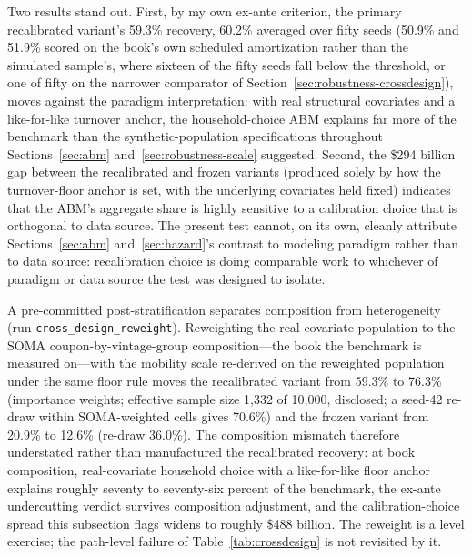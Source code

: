 \documentclass[12pt]{article}
\begin{document}
Two results stand out. First, by my own ex-ante criterion, the primary recalibrated variant's 59.3\% recovery, 60.2\% averaged over fifty seeds (50.9\% and 51.9\% scored on the book's own scheduled amortization rather than the simulated sample's, where sixteen of the fifty seeds fall below the threshold, or one of fifty on the narrower comparator of Section~\ref{sec:robustness-crossdesign}), moves against the paradigm interpretation: with real structural covariates and a like-for-like turnover anchor, the household-choice ABM explains far more of the benchmark than the synthetic-population specifications throughout Sections~\ref{sec:abm} and~\ref{sec:robustness-scale} suggested. Second, the \$294 billion gap between the recalibrated and frozen variants (produced solely by how the turnover-floor anchor is set, with the underlying covariates held fixed) indicates that the ABM's aggregate share is highly sensitive to a calibration choice that is orthogonal to data source. The present test cannot, on its own, cleanly attribute Sections~\ref{sec:abm} and~\ref{sec:hazard}'s contrast to modeling paradigm rather than to data source: recalibration choice is doing comparable work to whichever of paradigm or data source the test was designed to isolate.

A pre-committed post-stratification separates composition from heterogeneity (run \texttt{cross\_design\_reweight}). Reweighting the real-covariate population to the SOMA coupon-by-vintage-group composition---the book the benchmark is measured on---with the mobility scale re-derived on the reweighted population under the same floor rule moves the recalibrated variant from 59.3\% to 76.3\% (importance weights; effective sample size 1{,}332 of 10{,}000, disclosed; a seed-42 re-draw within SOMA-weighted cells gives 70.6\%) and the frozen variant from 20.9\% to 12.6\% (re-draw 36.0\%). The composition mismatch therefore understated rather than manufactured the recalibrated recovery: at book composition, real-covariate household choice with a like-for-like floor anchor explains roughly seventy to seventy-six percent of the benchmark, the ex-ante undercutting verdict survives composition adjustment, and the calibration-choice spread this subsection flags widens to roughly \$488 billion. The reweight is a level exercise; the path-level failure of Table~\ref{tab:crossdesign} is not revisited by it.
\end{document}

